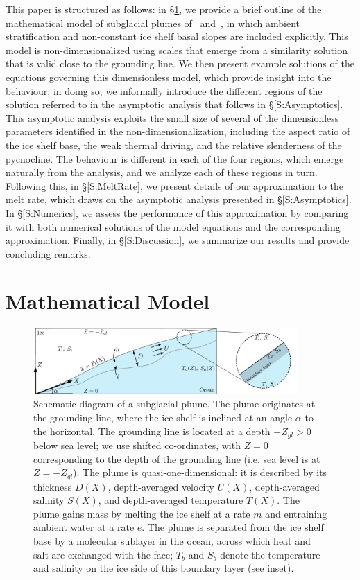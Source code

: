 \documentclass[openacc]{rsproca_new}%
\begin{document}
This paper is structured as follows: in \S\ref{S:Model}, we provide a brief outline of the mathematical model of subglacial plumes of~\cite{Jenkins1991JGeophysResOceans} and~\cite{Jenkins2011JPhysOcean}, in which ambient stratification and non-constant ice shelf basal slopes are included explicitly. This model is non-dimensionalized using scales that emerge from a similarity solution that is valid close to the grounding line. We then present example solutions of the equations governing this dimensionless model, which provide insight into the behaviour; in doing so, we informally introduce the different regions of the solution referred to in the asymptotic analysis that follows in \S\ref{S:Asymptotics}. This asymptotic analysis exploits the small size of several of the dimensionless parameters identified in the non-dimensionalization, including the aspect ratio of the ice shelf base, the weak thermal driving, and the relative slenderness of the pycnocline. The behaviour is different in each of the four regions, which emerge naturally from the analysis, and we analyze each of these regions in turn. Following this, in \S\ref{S:MeltRate}, we present details of our approximation to the melt rate, which draws on the asymptotic analysis presented in \S\ref{S:Asymptotics}. In \S\ref{S:Numerics}, we assess the performance of this approximation by comparing it with both numerical solutions of the model equations and the corresponding~\citet{Lazeroms2019JPhysOcean} approximation. Finally, in \S\ref{S:Discussion}, we summarize our results and provide concluding remarks. 


\section{Mathematical Model}\label{S:Model}

\begin{figure}
\centering
\includegraphics[width = 0.9\textwidth]{Submitted_PRSA/make_plots/plots/figure1.pdf}
\caption{Schematic diagram of a subglacial-plume. The plume originates at the grounding line, where the ice shelf is inclined at an angle $\alpha$ to the horizontal. The grounding line is located at a depth $-Z_{gl} >0$ below sea level; we use shifted co-ordinates, with $Z = 0$ corresponding to the depth of the grounding line (i.e. sea level is at $Z = -Z_{gl}$). The plume is quasi-one-dimensional: it is described by its thickness $D(X)$, depth-averaged velocity $U(X)$, depth-averaged salinity $S(X)$, and depth-averaged temperature $T(X)$.  The plume gains mass by melting the ice shelf at a rate $\dot{m}$ and entraining ambient water at a rate $\dot{e}$. The plume is separated from the ice shelf base by a molecular sublayer in the ocean, across which heat and salt are exchanged with the face; $T_b$ and $S_b$ denote the temperature and salinity on the ice side of this boundary layer (see inset).}\label{fig:Schematic}
\end{figure}
\end{document}
